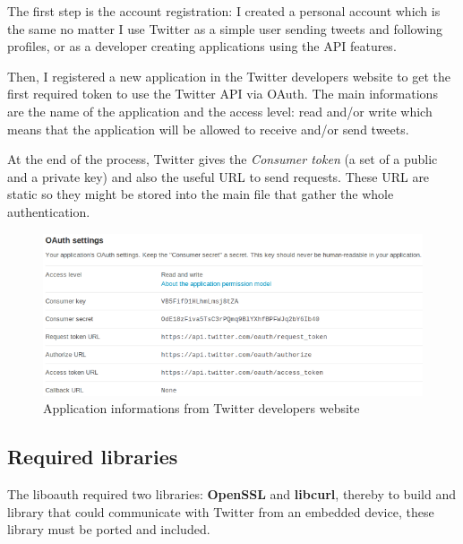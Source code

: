 
\hspace{15mm}The first step is the account registration: I created a personal account which is the same no matter I use Twitter as a simple user sending tweets and following profiles, or as a developer creating applications using the API features.

Then, I registered a new application in the Twitter developers website to get the first required token to use the Twitter API via OAuth. The main informations are the name of the application and the access level: read and/or write which means that the application will be allowed to receive and/or send tweets.

At the end of the process, Twitter gives the \textit{Consumer token} (a set of a public and a private key) and also the useful URL to send requests. These URL are static so they might be stored into the main file that gather the whole authentication. 

\clearpage
\begin{figure}[h]
  \centering
  \includegraphics[scale=0.75]{images/register.png}
  \caption{Application informations from Twitter developers website}
\end{figure}


\subsection{Required libraries}


The liboauth required two libraries: \textbf{OpenSSL} and \textbf{libcurl}, thereby to build and library that could communicate with Twitter from an embedded device, these library must be ported and included.

